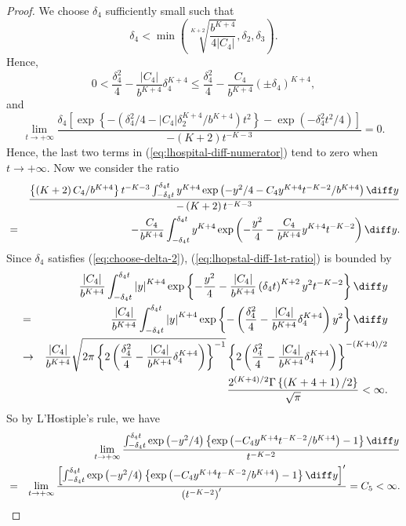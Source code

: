 \begin{proof}
We choose $\delta_{4}$ sufficiently small such that 
\begin{equation}
\delta_{4}<\min\left(\sqrt[K+2]{\frac{b^{K+4}}{4\left|C_{4}\right|}},\delta_{2},\delta_{3}\right).\label{eq:choose-delta-2}
\end{equation}
Hence, 
\[
0<\frac{\delta_{4}^{2}}{4}-\frac{\left|C_{4}\right|}{b^{K+4}}\delta_{4}^{K+4}\le\frac{\delta_{4}^{2}}{4}-\frac{C_{4}}{b^{K+4}}\left(\pm\delta_{4}\right)^{K+4},
\]
and 
\[
\lim_{t\rightarrow+\infty}\frac{\delta_{4}\left[\exp\left\{ -\left(\delta_{4}^{2}/4-\left|C_{4}\right|\delta_{2}^{K+4}/b^{K+4}\right)t^{2}\right\} -\exp\left(-\delta_{4}^{2}t^{2}/4\right)\right]}{-\left(K+2\right)t^{-K-3}}=0.
\]
Hence, the last two terms in (\ref{eq:lhospital-diff-numerator})
tend to zero when $t\rightarrow+\infty$. Now we consider the ratio
\begin{eqnarray}
 &  & \frac{\left\{ \left(K+2\right)C_{4}/b^{K+4}\right\} t^{-K-3}\int_{-\delta_{4}t}^{\delta_{4}t}y^{K+4}\exp\left(-y^{2}/4-C_{4}y^{K+4}t^{-K-2}/b^{K+4}\right)\diff y}{-\left(K+2\right)t^{-K-3}}\nonumber \\
 & = & -\frac{C_{4}}{b^{K+4}}\int_{-\delta_{4}t}^{\delta_{4}t}y^{K+4}\exp\left(-\frac{y^{2}}{4}-\frac{C_{4}}{b^{K+4}}y^{K+4}t^{-K-2}\right)\diff y.\label{eq:lhopstal-diff-1st-ratio}
\end{eqnarray}
Since $\delta_{4}$ satisfies (\ref{eq:choose-delta-2}), (\ref{eq:lhopstal-diff-1st-ratio})
is bounded by 
\begin{eqnarray*}
 &  & \frac{\left|C_{4}\right|}{b^{K+4}}\int_{-\delta_{4}t}^{\delta_{4}t}\left|y\right|^{K+4}\exp\left\{ -\frac{y^{2}}{4}-\frac{\left|C_{4}\right|}{b^{K+4}}\left(\delta_{4}t\right)^{K+2}y^{2}t^{-K-2}\right\} \diff y\\
 & = & \frac{\left|C_{4}\right|}{b^{K+4}}\int_{-\delta_{4}t}^{\delta_{4}t}\left|y\right|^{K+4}\exp\left\{ -\left(\frac{\delta_{4}^{2}}{4}-\frac{\left|C_{4}\right|}{b^{K+4}}\delta_{4}^{K+4}\right)y^{2}\right\} \diff y\\
 & \rightarrow & \frac{\left|C_{4}\right|}{b^{K+4}}\sqrt{2\pi\left\{ 2\left(\frac{\delta_{4}^{2}}{4}-\frac{\left|C_{4}\right|}{b^{K+4}}\delta_{4}^{K+4}\right)\right\} ^{-1}}\left\{ 2\left(\frac{\delta_{4}^{2}}{4}-\frac{\left|C_{4}\right|}{b^{K+4}}\delta_{4}^{K+4}\right)\right\} ^{-\left(K+4\right)/2}\\ & &\frac{2^{\left(K+4\right)/2}\Gamma\left\{ \left(K+4+1\right)/2\right\} }{\sqrt{\pi}}<\infty.
\end{eqnarray*}
So by L'Hostiple's rule, we have 
\begin{eqnarray*}
 &  & \lim_{t\rightarrow+\infty}\frac{\int_{-\delta_{4}t}^{\delta_{4}t}\exp\left(-y^{2}/4\right)\left\{ \exp\left(-C_{4}y^{K+4}t^{-K-2}/b^{K+4}\right)-1\right\} \diff y}{t^{-K-2}}\\
 & = & \lim_{t\rightarrow+\infty}\frac{\left[\int_{-\delta_{4}t}^{\delta_{4}t}\exp\left(-y^{2}/4\right)\left\{ \exp\left(-C_{4}y^{K+4}t^{-K-2}/b^{K+4}\right)-1\right\} \diff y\right]'}{\left(t^{-K-2}\right)'}=C_{5}<\infty.
\end{eqnarray*}
\end{proof}
